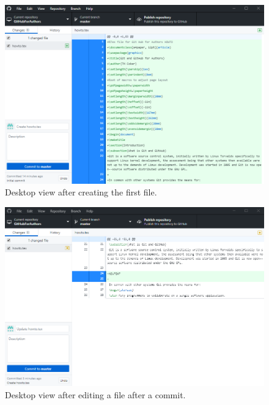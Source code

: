 \documentclass[a4paper, 12pt]{article}
\begin{document}
\begin{figure}
\centering
\includegraphics[width=\linewidth]{FirstFile}
\caption{Desktop view after creating the first file.}
\label{firstfile}
\end{figure}

\begin{figure}
\centering
\includegraphics[width=\linewidth]{FirstChange}
\caption{Desktop view after editing a file after a commit.}
\label{firstchange}
\end{figure}
\end{document}

